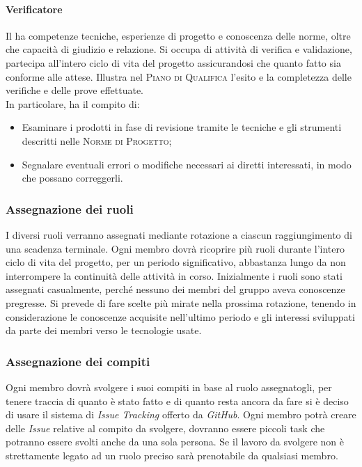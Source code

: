 \paragraph{Verificatore}

Il \textbf{} ha competenze tecniche, esperienze di progetto e conoscenza delle norme, oltre che 
capacità di giudizio e relazione. Si occupa di attività di verifica e validazione, partecipa all'intero ciclo di vita 
del progetto assicurandosi che quanto fatto sia conforme alle attese. Illustra nel \textsc{Piano di Qualifica} l'esito 
e la completezza delle verifiche e delle prove effettuate.\\
In particolare, ha il compito di:
\begin{itemize}
    \item Esaminare i prodotti in fase di revisione tramite le tecniche e gli strumenti descritti nelle \textsc{Norme di Progetto};
    \item Segnalare eventuali errori o modifiche necessari ai diretti interessati, in modo che possano correggerli.
\end{itemize}

\subsubsection{Assegnazione dei ruoli}

I diversi ruoli verranno assegnati mediante rotazione a ciascun raggiungimento di una scadenza terminale. Ogni membro 
dovrà ricoprire più ruoli durante l'intero ciclo di vita del progetto, per un periodo significativo, abbastanza lungo 
da non interrompere la continuità delle attività in corso. Inizialmente i ruoli sono stati assegnati casualmente, 
perché nessuno dei membri del gruppo aveva conoscenze pregresse. Si prevede di fare scelte più mirate nella prossima 
rotazione, tenendo in considerazione le conoscenze acquisite nell'ultimo periodo e gli interessi sviluppati da parte 
dei membri verso le tecnologie usate.

\subsubsection{Assegnazione dei compiti}

Ogni membro dovrà svolgere i suoi compiti in base al ruolo assegnatogli, per tenere traccia di quanto è stato fatto e di 
quanto resta ancora da fare si è deciso di usare il sistema di \emph{Issue Tracking} offerto da \emph{GitHub}. Ogni 
membro potrà creare delle \emph{Issue} relative al compito da svolgere, dovranno essere piccoli task che potranno 
essere svolti anche da una sola persona. Se il lavoro da svolgere non è strettamente legato ad un ruolo preciso sarà 
prenotabile da qualsiasi membro.

